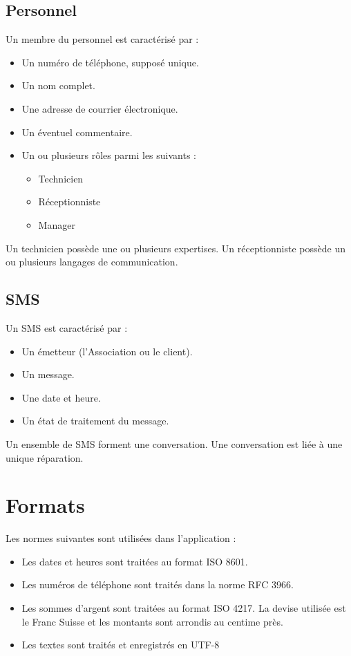 \documentclass{article}
\begin{document}
\subsection*{Personnel}
Un membre du personnel est caractérisé par :
\begin{itemize}
    \item Un numéro de téléphone, supposé unique.
    \item Un nom complet.
    \item Une adresse de courrier électronique.
    \item Un éventuel commentaire.
    \item Un ou plusieurs rôles parmi les suivants :
    \begin{itemize}
        \item Technicien
        \item Réceptionniste
        \item Manager
    \end{itemize}
\end{itemize}

Un technicien possède une ou plusieurs expertises. Un réceptionniste possède un ou plusieurs langages de communication.

\subsection*{SMS}
Un SMS est caractérisé par :
\begin{itemize}
    \item Un émetteur (l'Association ou le client).
    \item Un message.
    \item Une date et heure.
    \item Un état de traitement du message.
\end{itemize}

Un ensemble de SMS forment une conversation. Une conversation est liée à une unique réparation.

\section{Formats}
Les normes suivantes sont utilisées dans l'application :
\begin{itemize}
    \item Les dates et heures sont traitées au format ISO 8601.
    \item Les numéros de téléphone sont traités dans la norme RFC 3966.
    \item Les sommes d'argent sont traitées au format ISO 4217. La devise utilisée est le Franc Suisse et les montants sont arrondis au centime près.
    \item Les textes sont traités et enregistrés en UTF-8
\end{itemize}
\end{document}
